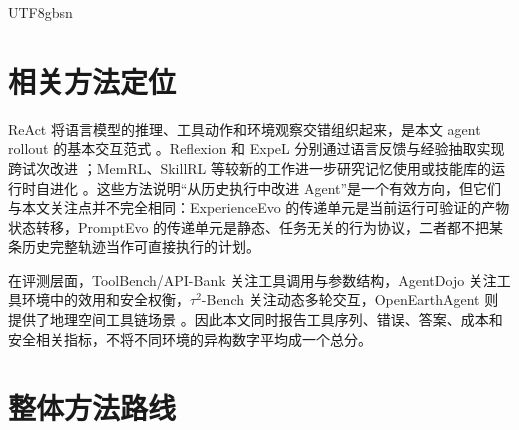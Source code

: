 \documentclass[a4paper,11pt]{article}
\begin{document}
\begin{CJK*}{UTF8}{gbsn}
\section{相关方法定位}

ReAct 将语言模型的推理、工具动作和环境观察交错组织起来，是本文 agent rollout 的基本交互范式 \cite{react}。Reflexion 和 ExpeL 分别通过语言反馈与经验抽取实现跨试次改进 \cite{reflexion,expel}；MemRL、SkillRL 等较新的工作进一步研究记忆使用或技能库的运行时自进化 \cite{memrl,skillrl}。这些方法说明“从历史执行中改进 Agent”是一个有效方向，但它们与本文关注点并不完全相同：ExperienceEvo 的传递单元是当前运行可验证的产物状态转移，PromptEvo 的传递单元是静态、任务无关的行为协议，二者都不把某条历史完整轨迹当作可直接执行的计划。

在评测层面，ToolBench/API-Bank 关注工具调用与参数结构，AgentDojo 关注工具环境中的效用和安全权衡，$\tau^2$-Bench 关注动态多轮交互，OpenEarthAgent 则提供了地理空间工具链场景 \cite{toolllm,apibank,agentdojo,tau2,openearthagent}。因此本文同时报告工具序列、错误、答案、成本和安全相关指标，不将不同环境的异构数字平均成一个总分。

\section{整体方法路线}


\end{CJK*}
\end{document}
